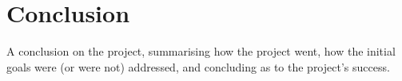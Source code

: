 \chapter{Conclusion} %
\label{cha:conclusion}
A conclusion on the project, summarising how the project went, how the initial goals were (or were not) addressed, and concluding as to the project's success. 

